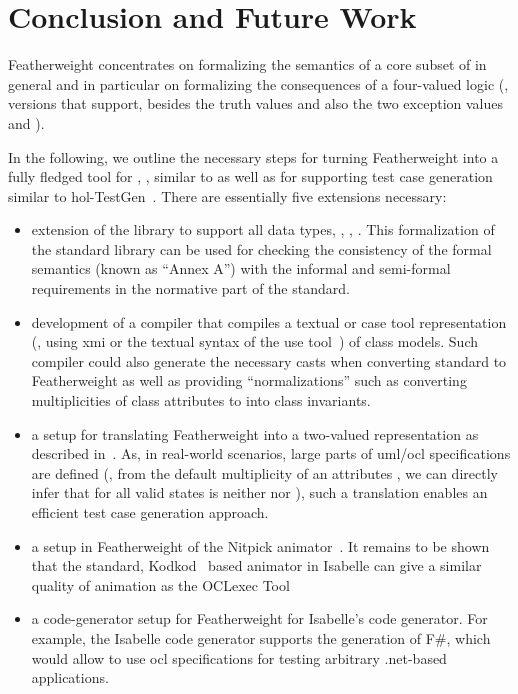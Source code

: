 \section{Conclusion and Future Work}
Featherweight \OCL concentrates on formalizing the semantics of a core
subset of \OCL in general and in particular on formalizing the
consequences of a four-valued logic (\ie, \OCL versions that support,
besides the truth values  and  also
the two exception values  and ).

In the following, we outline the necessary steps for turning
Featherweight \OCL into a fully fledged tool for \OCL, \eg, similar to
\holocl as well as for supporting test case generation similar to
\acs{hol}-TestGen~\cite{brucker.ea:hol-testgen:2009}.  There are
essentially five extensions necessary:
\begin{itemize}
\item extension of  the library to support all \OCL data types, \eg,
  , . %
  This formalization of the \OCL standard library can be used for
  checking the consistency of the formal semantics (known as ``Annex
  A'') with the informal and semi-formal requirements in the normative
  part of the \OCL standard.
\item development of a compiler that compiles a textual or \acs{case}
  tool representation (\eg, using \acs{xmi} or the textual syntax of
  the \acs{use} tool~\cite{richters:precise:2002}) of class
  models. Such compiler could also generate the necessary casts when
  converting standard \OCL to Featherweight \OCL as well as providing
  ``normalizations'' such as converting multiplicities of class
  attributes to into \OCL class invariants.
\item a setup for translating Featherweight \OCL into a two-valued
  representation as described
  in~\cite{brucker.ea:ocl-testing:2010}. As, in real-world scenarios,
  large parts of \acs{uml}/\acs{ocl} specifications are defined (\eg,
  from the default multiplicity  of an attributes
  , we can directly infer that for all valid states
   is neither  nor ),
  such a translation enables an efficient test case generation
  approach.
\item a setup in Featherweight \OCL of the Nitpick
  animator~\cite{blanchette.ea:nitpick:2010}. It remains to be shown
  that the standard, Kodkod~\cite{torlak.ea:kodkod:2007} based
  animator in Isabelle can give a similar quality of animation as the
  OCLexec Tool~\cite{krieger.ea:generative:2010}
\item a code-generator setup for Featherweight \OCL for Isabelle's
  code generator. For example, the Isabelle code generator supports
  the generation of F\#, which would allow to use \acs{ocl}
  specifications for testing arbitrary .net-based applications.
\end{itemize}
